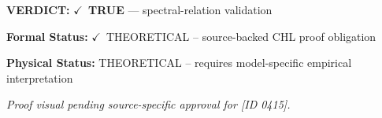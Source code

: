 \textbf{VERDICT:} \ensuremath{\checkmark}\ \textbf{TRUE} --- spectral-relation validation

\textbf{Formal Status:} \ensuremath{\checkmark}\ THEORETICAL -- source-backed CHL proof obligation

\textbf{Physical Status:} THEORETICAL -- requires model-specific empirical interpretation
\par\vspace{0.45em}
\par
\vfill
\begingroup\footnotesize\itshape
Proof visual pending source-specific approval for [ID 0415].
\par\endgroup
\vfill
\endgroup
\endgroup
